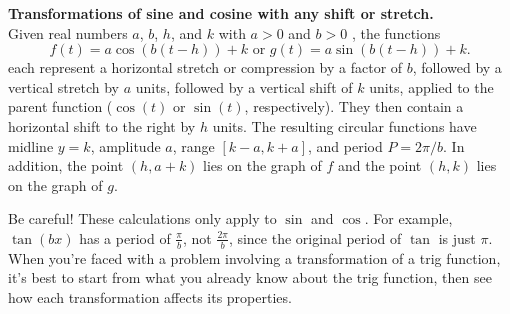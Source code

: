 \documentclass{ximera}
\begin{document}
\begin{callout}
\textbf{Transformations of sine and cosine with any shift or stretch.}\\
Given real numbers \(a\), \(b\), \(h\), and \(k\) with \(a > 0\) and \(b > 0\) , the functions%
\begin{equation*}
f(t) = a\cos(b(t-h))+k \text{ or } g(t) = a\sin(b(t-h)) + k\text{.}
\end{equation*}
each represent a horizontal stretch or compression by a factor of $b$, followed by a vertical stretch by \(a\) units, followed by a vertical shift of \(k\) units, applied to the parent function (\(\cos(t)\) or \(\sin(t)\), respectively). They then contain a horizontal shift to the right by $h$ units. The resulting circular functions have midline \(y = k\), amplitude \(a\), range \([k-a,k+a]\), and period \(P = 2\pi/b\). In addition, the point \((h,a+k)\) lies on the graph of \(f\) and the point \((h, k)\) lies on the graph of \(g\).
\end{callout}

Be careful! These calculations only apply to $\sin$ and $\cos$. For example, $\tan(bx)$ has a period of $\frac{\pi}{b}$, not $\frac{2\pi}{b}$, since the original period of $\tan$ is just $\pi$. When you're faced with a problem involving a transformation of a trig function, it's best to start from what you already know about the trig function, then see how each transformation affects its properties. 
\end{document}
